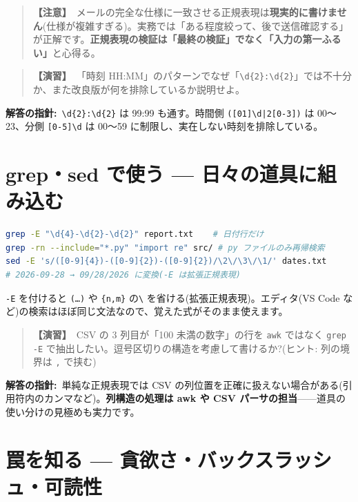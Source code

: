 \documentclass{article}
\begin{document}
\begin{quote}
\textbf{【注意】}\ メールの完全な仕様に一致させる正規表現は\textbf{現実的に書けません}(仕様が複雑すぎる)。実務では「ある程度絞って、後で送信確認する」が正解です。\textbf{正規表現の検証は「最終の検証」でなく「入力の第一ふるい」}と心得る。
\end{quote}

\begin{quote}
\textbf{【演習】}\ 「時刻 HH:MM」のパターンでなぜ「\texttt{\textbackslash d\{2\}:\textbackslash d\{2\}}」では不十分か、また改良版が何を排除しているか説明せよ。
\end{quote}

\textbf{解答の指針:}\ \texttt{\textbackslash d\{2\}:\textbackslash d\{2\}} は 99:99 も通す。時間側 \texttt{([01]\textbackslash d|2[0-3])} は 00〜23、分側 \texttt{[0-5]\textbackslash d} は 00〜59 に制限し、実在しない時刻を排除している。

\section{grep・sed で使う — 日々の道具に組み込む}

\begin{lstlisting}[language=bash]
grep -E "\d{4}-\d{2}-\d{2}" report.txt    # 日付行だけ
grep -rn --include="*.py" "import re" src/ # py ファイルのみ再帰検索
sed -E 's/([0-9]{4})-([0-9]{2})-([0-9]{2})/\2\/\3\/\1/' dates.txt
# 2026-09-28 → 09/28/2026 に変換(-E は拡張正規表現)
\end{lstlisting}

\texttt{-E} を付けると \texttt{(…)} や \texttt{\{n,m\}} の\texttt{\textbackslash} を省ける(拡張正規表現)。エディタ(VS Code など)の検索はほぼ同じ文法なので、覚えた式がそのまま使えます。

\begin{quote}
\textbf{【演習】}\ CSV の 3 列目が「100 未満の数字」の行を \texttt{awk} ではなく \texttt{grep -E} で抽出したい。逗号区切りの構造を考慮して書けるか?(ヒント: 列の境界は \texttt{,} で挟む)
\end{quote}

\textbf{解答の指針:}\ 単純な正規表現では CSV の列位置を正確に扱えない場合がある(引用符内のカンマなど)。\textbf{列構造の処理は awk や CSV パーサの担当}——道具の使い分けの見極めも実力です。

\section{罠を知る — 貪欲さ・バックスラッシュ・可読性}
\end{document}
